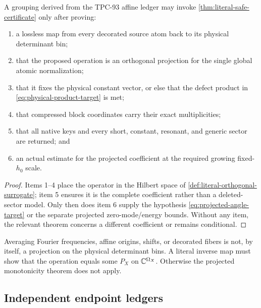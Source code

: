 \begin{proposition}
\label{prop:promotion-checklist}
A grouping derived from the TPC-93 affine ledger may invoke
\cref{thm:literal-safe-certificate} only after proving:
\begin{enumerate}[label=(\arabic*),leftmargin=2.2em]
\item a lossless map from every decorated source atom back to its
  physical determinant bin;
\item that the proposed operation is an orthogonal projection for
  the single global atomic normalization;
\item that it fixes the physical constant vector, or else that the
  defect product in \eqref{eq:physical-product-target} is met;
\item that compressed block coordinates carry their exact
  multiplicities;
\item that all native keys and every short, constant, resonant, and
  generic sector are returned; and
\item an actual estimate for the projected coefficient at the
  required growing fixed-\(h_0\) scale.
\end{enumerate}
\end{proposition}

\begin{proof}
Items 1--4 place the operator in the Hilbert space of
\cref{def:literal-orthogonal-surrogate}; item 5 ensures it is the
complete coefficient rather than a deleted-sector model.  Only
then does item 6 supply the hypothesis
\eqref{eq:projected-angle-target} or the separate projected
zero-mode/energy bounds.  Without any item, the relevant theorem
concerns a different coefficient or remains conditional.
\end{proof}

\begin{remark}
\label{rem:frequency-not-bin}
Averaging Fourier frequencies, affine origins, shifts, or decorated
fibers is not, by itself, a projection on the physical determinant
bins.  A literal inverse map must show that the operation equals
some \(P_X\) on \(\mathbb C^{\Omega_X}\).  Otherwise the projected
monotonicity theorem does not apply.
\end{remark}

\subsection{Independent endpoint ledgers}

